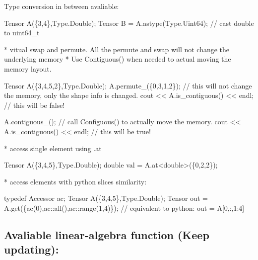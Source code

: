 \begin{DoxyItemize}
\item Type conversion in between avaliable\+: 
\begin{DoxyCode}
Tensor A(\{3,4\},Type.Double);
Tensor B = A.astype(Type.Uint64); \textcolor{comment}{// cast double to uint64\_t}
\end{DoxyCode}
 \begin{DoxyVerb}    * vitual swap and permute. All the permute and swap will not change the underlying memory
    * Use Contiguous() when needed to actual moving the memory layout.
\end{DoxyVerb}
 
\begin{DoxyCode}
Tensor A(\{3,4,5,2\},Type.Double);
A.permute\_(\{0,3,1,2\}); \textcolor{comment}{// this will not change the memory, only the shape info is changed.}
cout << A.is\_contiguous() << endl; \textcolor{comment}{// this will be false!}

A.contiguous\_(); \textcolor{comment}{// call Configuous() to actually move the memory.}
cout << A.is\_contiguous() << endl; \textcolor{comment}{// this will be true!}
\end{DoxyCode}
 \begin{DoxyVerb}    * access single element using .at
\end{DoxyVerb}
 
\begin{DoxyCode}
Tensor A(\{3,4,5\},Type.Double);
\textcolor{keywordtype}{double} val = A.at<\textcolor{keywordtype}{double}>(\{0,2,2\});
\end{DoxyCode}
 \begin{DoxyVerb}    * access elements with python slices similarity:
\end{DoxyVerb}
 
\begin{DoxyCode}
\textcolor{keyword}{typedef} Accessor ac;
Tensor A(\{3,4,5\},Type.Double);
Tensor out = A.get(\{ac(0),ac::all(),ac::range(1,4)\}); 
\textcolor{comment}{// equivalent to python: out = A[0,:,1:4]}
\end{DoxyCode}

\end{DoxyItemize}

\subsection*{Avaliable linear-\/algebra function (Keep updating)\+:}

